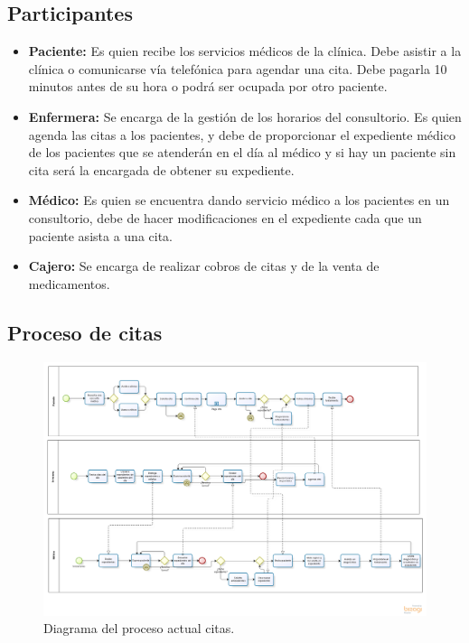 \subsection{Participantes}

\begin{itemize}
	\item \textbf{Paciente: }Es quien recibe los servicios médicos de la clínica. Debe asistir a la clínica o comunicarse vía telefónica para agendar una cita. Debe pagarla 10 minutos antes de su hora o podrá ser ocupada por otro paciente.
    \item \textbf{Enfermera: }Se encarga de la gestión de los horarios del consultorio. Es quien agenda las citas a los pacientes, y debe de proporcionar el expediente médico de los pacientes que se atenderán en el día al médico y si hay un paciente sin cita será la encargada de obtener su expediente.
    \item \textbf{Médico: }Es quien se encuentra dando servicio médico a los pacientes en un consultorio, debe de hacer modificaciones en el expediente cada que un paciente asista a una cita.
    \item \textbf{Cajero: }Se encarga de realizar cobros de citas y de la venta de medicamentos.
\end{itemize}
\subsection{Proceso de citas}

\begin{figure}[htbp!]
		\centering
			\includegraphics[width=1\textwidth]{images/Proceso_actual_citas}
		\caption{Diagrama del proceso actual citas.}
	\end{figure}
    \newpage
